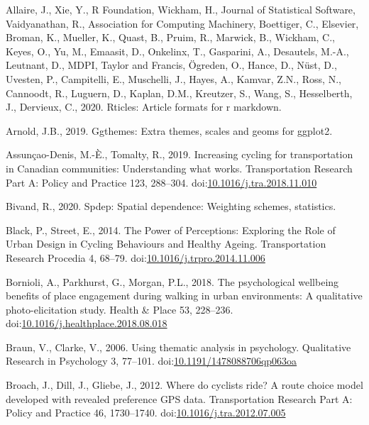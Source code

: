 \documentclass[]{elsarticle} %
\begin{document}
\leavevmode\hypertarget{ref-R-rticles}{}%
Allaire, J., Xie, Y., R Foundation, Wickham, H., Journal of Statistical
Software, Vaidyanathan, R., Association for Computing Machinery,
Boettiger, C., Elsevier, Broman, K., Mueller, K., Quast, B., Pruim, R.,
Marwick, B., Wickham, C., Keyes, O., Yu, M., Emaasit, D., Onkelinx, T.,
Gasparini, A., Desautels, M.-A., Leutnant, D., MDPI, Taylor and Francis,
Ögreden, O., Hance, D., Nüst, D., Uvesten, P., Campitelli, E.,
Muschelli, J., Hayes, A., Kamvar, Z.N., Ross, N., Cannoodt, R., Luguern,
D., Kaplan, D.M., Kreutzer, S., Wang, S., Hesselberth, J., Dervieux, C.,
2020. Rticles: Article formats for r markdown.

\leavevmode\hypertarget{ref-R-ggthemes}{}%
Arnold, J.B., 2019. Ggthemes: Extra themes, scales and geoms for
ggplot2.

\leavevmode\hypertarget{ref-assuncao-denisIncreasingCyclingTransportation2019a}{}%
Assunçao-Denis, M.-È., Tomalty, R., 2019. Increasing cycling for
transportation in Canadian communities: Understanding what works.
Transportation Research Part A: Policy and Practice 123, 288--304.
doi:\href{https://doi.org/10.1016/j.tra.2018.11.010}{10.1016/j.tra.2018.11.010}

\leavevmode\hypertarget{ref-R-spdep}{}%
Bivand, R., 2020. Spdep: Spatial dependence: Weighting schemes,
statistics.

\leavevmode\hypertarget{ref-blackPowerPerceptionsExploring2014a}{}%
Black, P., Street, E., 2014. The Power of Perceptions: Exploring the
Role of Urban Design in Cycling Behaviours and Healthy Ageing.
Transportation Research Procedia 4, 68--79.
doi:\href{https://doi.org/10.1016/j.trpro.2014.11.006}{10.1016/j.trpro.2014.11.006}

\leavevmode\hypertarget{ref-bornioliPsychologicalWellbeingBenefits2018}{}%
Bornioli, A., Parkhurst, G., Morgan, P.L., 2018. The psychological
wellbeing benefits of place engagement during walking in urban
environments: A qualitative photo-elicitation study. Health \& Place 53,
228--236.
doi:\href{https://doi.org/10.1016/j.healthplace.2018.08.018}{10.1016/j.healthplace.2018.08.018}

\leavevmode\hypertarget{ref-braunUsingThematicAnalysis2006}{}%
Braun, V., Clarke, V., 2006. Using thematic analysis in psychology.
Qualitative Research in Psychology 3, 77--101.
doi:\href{https://doi.org/10.1191/1478088706qp063oa}{10.1191/1478088706qp063oa}

\leavevmode\hypertarget{ref-broachWhereCyclistsRide2012}{}%
Broach, J., Dill, J., Gliebe, J., 2012. Where do cyclists ride? A route
choice model developed with revealed preference GPS data. Transportation
Research Part A: Policy and Practice 46, 1730--1740.
doi:\href{https://doi.org/10.1016/j.tra.2012.07.005}{10.1016/j.tra.2012.07.005}
\end{document}
